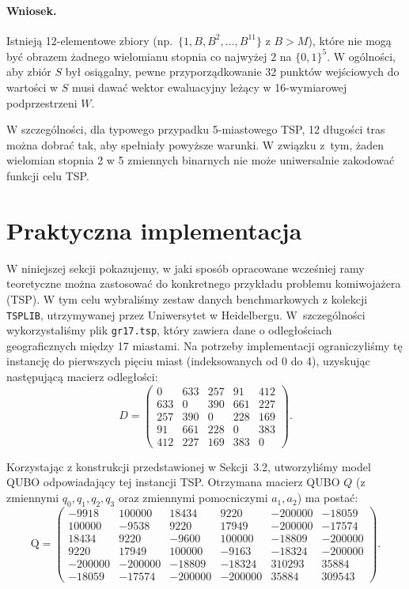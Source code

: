 \paragraph{Wniosek.}
Istnieją 12-elementowe zbiory (np.\ $\{1, B, B^2, \dots, B^{11}\}$ z
$B>M$), które nie mogą być obrazem żadnego wielomianu stopnia co najwyżej $2$ 
na $\{0,1\}^5$. W ogólności, aby zbiór $S$ był osiągalny, pewne przyporządkowanie
32 punktów wejściowych do wartości w $S$ musi dawać wektor ewaluacyjny leżący
w 16-wymiarowej podprzestrzeni $W$.

W szczególności, dla typowego przypadku 5-miastowego TSP, 12 długości tras można dobrać tak, aby spełniały powyższe warunki. W związku z~tym, żaden wielomian stopnia 2 w 5 zmiennych binarnych nie może uniwersalnie zakodować funkcji celu TSP.

\section{Praktyczna implementacja}

W niniejszej sekcji pokazujemy, w jaki sposób opracowane wcześniej ramy teoretyczne można zastosować do konkretnego przykładu problemu komiwojażera (TSP). W tym celu wybraliśmy zestaw danych benchmarkowych z kolekcji \texttt{TSPLIB}, utrzymywanej przez Uniwersytet w Heidelbergu. W~szczególności wykorzystaliśmy plik \texttt{gr17.tsp}, który zawiera dane o odległościach geograficznych między 17 miastami. Na potrzeby implementacji ograniczyliśmy tę instancję do pierwszych pięciu miast (indeksowanych od 0 do 4), uzyskując następującą macierz odległości:
\[
D=\begin{pmatrix}
0 & 633 & 257 & 91 & 412\\
633 & 0 & 390 & 661 & 227\\
257 & 390 & 0 & 228 & 169\\
91 & 661 & 228 & 0 & 383\\
412 & 227 & 169 & 383 & 0
\end{pmatrix}.
\]

Korzystając z konstrukcji przedstawionej w Sekcji~3.2, utworzyliśmy model QUBO odpowiadający tej instancji TSP. Otrzymana macierz QUBO \(Q\) (z zmiennymi \(q_0,q_1,q_2,q_3\) oraz zmiennymi pomocniczymi \(a_1,a_2\)) ma postać:
\[
\text{Q} =
\begin{pmatrix}
-9918 & 100000 & 18434 & 9220 & -200000 & -18059 \\
100000 & -9538 & 9220 & 17949 & -200000 & -17574 \\
18434 & 9220 & -9600 & 100000 & -18809 & -200000 \\
9220 & 17949 & 100000 & -9163 & -18324 & -200000 \\
-200000 & -200000 & -18809 & -18324 & 310293 & 35884 \\
-18059 & -17574 & -200000 & -200000 & 35884 & 309543
\end{pmatrix}.
\]

